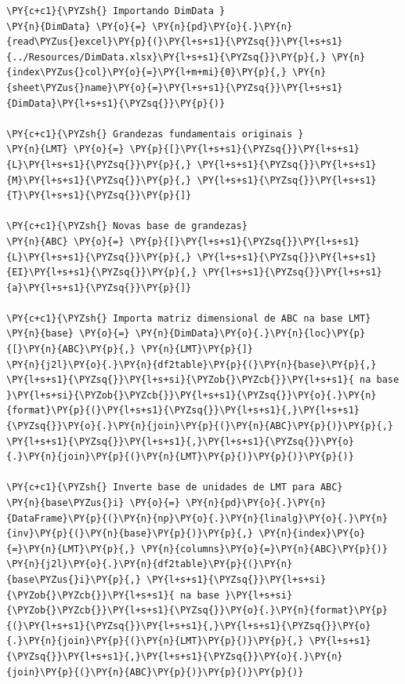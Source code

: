     \begin{tcolorbox}[breakable, size=fbox, boxrule=1pt, pad at break*=1mm,colback=cellbackground, colframe=cellborder]
\begin{Verbatim}[commandchars=\\\{\}]
\PY{c+c1}{\PYZsh{} Importando DimData }
\PY{n}{DimData} \PY{o}{=} \PY{n}{pd}\PY{o}{.}\PY{n}{read\PYZus{}excel}\PY{p}{(}\PY{l+s+s1}{\PYZsq{}}\PY{l+s+s1}{../Resources/DimData.xlsx}\PY{l+s+s1}{\PYZsq{}}\PY{p}{,} \PY{n}{index\PYZus{}col}\PY{o}{=}\PY{l+m+mi}{0}\PY{p}{,} \PY{n}{sheet\PYZus{}name}\PY{o}{=}\PY{l+s+s1}{\PYZsq{}}\PY{l+s+s1}{DimData}\PY{l+s+s1}{\PYZsq{}}\PY{p}{)}

\PY{c+c1}{\PYZsh{} Grandezas fundamentais originais }
\PY{n}{LMT} \PY{o}{=} \PY{p}{[}\PY{l+s+s1}{\PYZsq{}}\PY{l+s+s1}{L}\PY{l+s+s1}{\PYZsq{}}\PY{p}{,} \PY{l+s+s1}{\PYZsq{}}\PY{l+s+s1}{M}\PY{l+s+s1}{\PYZsq{}}\PY{p}{,} \PY{l+s+s1}{\PYZsq{}}\PY{l+s+s1}{T}\PY{l+s+s1}{\PYZsq{}}\PY{p}{]}

\PY{c+c1}{\PYZsh{} Novas base de grandezas}
\PY{n}{ABC} \PY{o}{=} \PY{p}{[}\PY{l+s+s1}{\PYZsq{}}\PY{l+s+s1}{L}\PY{l+s+s1}{\PYZsq{}}\PY{p}{,} \PY{l+s+s1}{\PYZsq{}}\PY{l+s+s1}{EI}\PY{l+s+s1}{\PYZsq{}}\PY{p}{,} \PY{l+s+s1}{\PYZsq{}}\PY{l+s+s1}{a}\PY{l+s+s1}{\PYZsq{}}\PY{p}{]} 

\PY{c+c1}{\PYZsh{} Importa matriz dimensional de ABC na base LMT}
\PY{n}{base} \PY{o}{=} \PY{n}{DimData}\PY{o}{.}\PY{n}{loc}\PY{p}{[}\PY{n}{ABC}\PY{p}{,} \PY{n}{LMT}\PY{p}{]}
\PY{n}{j2l}\PY{o}{.}\PY{n}{df2table}\PY{p}{(}\PY{n}{base}\PY{p}{,} \PY{l+s+s1}{\PYZsq{}}\PY{l+s+si}{\PYZob{}\PYZcb{}}\PY{l+s+s1}{ na base }\PY{l+s+si}{\PYZob{}\PYZcb{}}\PY{l+s+s1}{\PYZsq{}}\PY{o}{.}\PY{n}{format}\PY{p}{(}\PY{l+s+s1}{\PYZsq{}}\PY{l+s+s1}{,}\PY{l+s+s1}{\PYZsq{}}\PY{o}{.}\PY{n}{join}\PY{p}{(}\PY{n}{ABC}\PY{p}{)}\PY{p}{,} \PY{l+s+s1}{\PYZsq{}}\PY{l+s+s1}{,}\PY{l+s+s1}{\PYZsq{}}\PY{o}{.}\PY{n}{join}\PY{p}{(}\PY{n}{LMT}\PY{p}{)}\PY{p}{)}\PY{p}{)}

\PY{c+c1}{\PYZsh{} Inverte base de unidades de LMT para ABC}
\PY{n}{base\PYZus{}i} \PY{o}{=} \PY{n}{pd}\PY{o}{.}\PY{n}{DataFrame}\PY{p}{(}\PY{n}{np}\PY{o}{.}\PY{n}{linalg}\PY{o}{.}\PY{n}{inv}\PY{p}{(}\PY{n}{base}\PY{p}{)}\PY{p}{,} \PY{n}{index}\PY{o}{=}\PY{n}{LMT}\PY{p}{,} \PY{n}{columns}\PY{o}{=}\PY{n}{ABC}\PY{p}{)}
\PY{n}{j2l}\PY{o}{.}\PY{n}{df2table}\PY{p}{(}\PY{n}{base\PYZus{}i}\PY{p}{,} \PY{l+s+s1}{\PYZsq{}}\PY{l+s+si}{\PYZob{}\PYZcb{}}\PY{l+s+s1}{ na base }\PY{l+s+si}{\PYZob{}\PYZcb{}}\PY{l+s+s1}{\PYZsq{}}\PY{o}{.}\PY{n}{format}\PY{p}{(}\PY{l+s+s1}{\PYZsq{}}\PY{l+s+s1}{,}\PY{l+s+s1}{\PYZsq{}}\PY{o}{.}\PY{n}{join}\PY{p}{(}\PY{n}{LMT}\PY{p}{)}\PY{p}{,} \PY{l+s+s1}{\PYZsq{}}\PY{l+s+s1}{,}\PY{l+s+s1}{\PYZsq{}}\PY{o}{.}\PY{n}{join}\PY{p}{(}\PY{n}{ABC}\PY{p}{)}\PY{p}{)}\PY{p}{)}
\end{Verbatim}
\end{tcolorbox}


